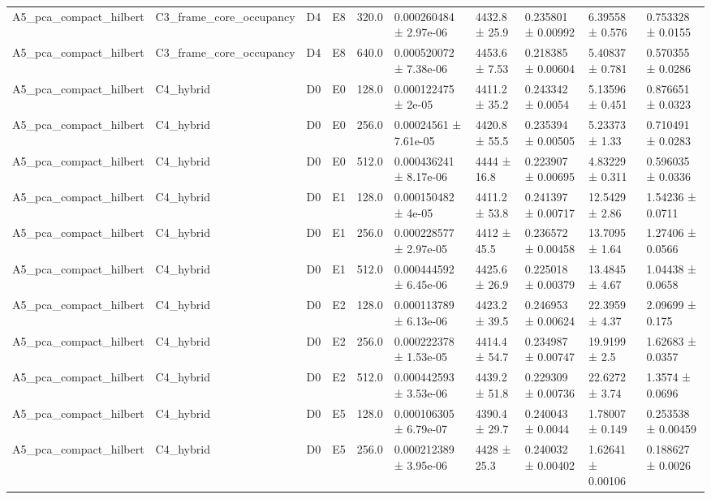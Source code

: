 \begin{table}
\begin{tabular}{llllllllll}
A5\_pca\_compact\_hilbert & C3\_frame\_core\_occupancy & D4 & E8 & 320.0 & 0.000260484 ± 2.97e-06 & 4432.8 ± 25.9 & 0.235801 ± 0.00992 & 6.39558 ± 0.576 & 0.753328 ± 0.0155 \\
A5\_pca\_compact\_hilbert & C3\_frame\_core\_occupancy & D4 & E8 & 640.0 & 0.000520072 ± 7.38e-06 & 4453.6 ± 7.53 & 0.218385 ± 0.00604 & 5.40837 ± 0.781 & 0.570355 ± 0.0286 \\
A5\_pca\_compact\_hilbert & C4\_hybrid & D0 & E0 & 128.0 & 0.000122475 ± 2e-05 & 4411.2 ± 35.2 & 0.243342 ± 0.0054 & 5.13596 ± 0.451 & 0.876651 ± 0.0323 \\
A5\_pca\_compact\_hilbert & C4\_hybrid & D0 & E0 & 256.0 & 0.00024561 ± 7.61e-05 & 4420.8 ± 55.5 & 0.235394 ± 0.00505 & 5.23373 ± 1.33 & 0.710491 ± 0.0283 \\
A5\_pca\_compact\_hilbert & C4\_hybrid & D0 & E0 & 512.0 & 0.000436241 ± 8.17e-06 & 4444 ± 16.8 & 0.223907 ± 0.00695 & 4.83229 ± 0.311 & 0.596035 ± 0.0336 \\
A5\_pca\_compact\_hilbert & C4\_hybrid & D0 & E1 & 128.0 & 0.000150482 ± 4e-05 & 4411.2 ± 53.8 & 0.241397 ± 0.00717 & 12.5429 ± 2.86 & 1.54236 ± 0.0711 \\
A5\_pca\_compact\_hilbert & C4\_hybrid & D0 & E1 & 256.0 & 0.000228577 ± 2.97e-05 & 4412 ± 45.5 & 0.236572 ± 0.00458 & 13.7095 ± 1.64 & 1.27406 ± 0.0566 \\
A5\_pca\_compact\_hilbert & C4\_hybrid & D0 & E1 & 512.0 & 0.000444592 ± 6.45e-06 & 4425.6 ± 26.9 & 0.225018 ± 0.00379 & 13.4845 ± 4.67 & 1.04438 ± 0.0658 \\
A5\_pca\_compact\_hilbert & C4\_hybrid & D0 & E2 & 128.0 & 0.000113789 ± 6.13e-06 & 4423.2 ± 39.5 & 0.246953 ± 0.00624 & 22.3959 ± 4.37 & 2.09699 ± 0.175 \\
A5\_pca\_compact\_hilbert & C4\_hybrid & D0 & E2 & 256.0 & 0.000222378 ± 1.53e-05 & 4414.4 ± 54.7 & 0.234987 ± 0.00747 & 19.9199 ± 2.5 & 1.62683 ± 0.0357 \\
A5\_pca\_compact\_hilbert & C4\_hybrid & D0 & E2 & 512.0 & 0.000442593 ± 3.53e-06 & 4439.2 ± 51.8 & 0.229309 ± 0.00736 & 22.6272 ± 3.74 & 1.3574 ± 0.0696 \\
A5\_pca\_compact\_hilbert & C4\_hybrid & D0 & E5 & 128.0 & 0.000106305 ± 6.79e-07 & 4390.4 ± 29.7 & 0.240043 ± 0.0044 & 1.78007 ± 0.149 & 0.253538 ± 0.00459 \\
A5\_pca\_compact\_hilbert & C4\_hybrid & D0 & E5 & 256.0 & 0.000212389 ± 3.95e-06 & 4428 ± 25.3 & 0.240032 ± 0.00402 & 1.62641 ± 0.00106 & 0.188627 ± 0.0026 \\

\end{tabular}
\end{table}
